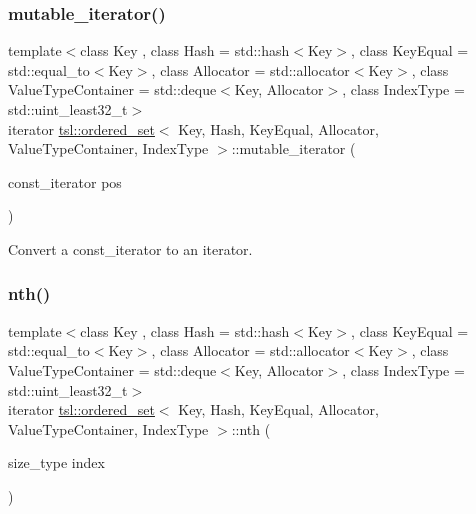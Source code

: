 \subsubsection{\texorpdfstring{mutable\_iterator()}{mutable\_iterator()}}
{\footnotesize\ttfamily template$<$class Key , class Hash  = std\+::hash$<$\+Key$>$, class Key\+Equal  = std\+::equal\+\_\+to$<$\+Key$>$, class Allocator  = std\+::allocator$<$\+Key$>$, class Value\+Type\+Container  = std\+::deque$<$\+Key, Allocator$>$, class Index\+Type  = std\+::uint\+\_\+least32\+\_\+t$>$ \\
iterator \mbox{\hyperlink{classtsl_1_1ordered__set}{tsl\+::ordered\+\_\+set}}$<$ Key, Hash, Key\+Equal, Allocator, Value\+Type\+Container, Index\+Type $>$\+::mutable\+\_\+iterator (\begin{DoxyParamCaption}\item[{const\+\_\+iterator}]{pos }\end{DoxyParamCaption})\hspace{0.3cm}{\ttfamily [inline]}}

Convert a const\+\_\+iterator to an iterator. \mbox{\label{classtsl_1_1ordered__set_adc4c67f752a07ced3348b0bc9a5afa3a}} 
\subsubsection{\texorpdfstring{nth()}{nth()}\hspace{0.1cm}{\footnotesize\ttfamily [1/2]}}
{\footnotesize\ttfamily template$<$class Key , class Hash  = std\+::hash$<$\+Key$>$, class Key\+Equal  = std\+::equal\+\_\+to$<$\+Key$>$, class Allocator  = std\+::allocator$<$\+Key$>$, class Value\+Type\+Container  = std\+::deque$<$\+Key, Allocator$>$, class Index\+Type  = std\+::uint\+\_\+least32\+\_\+t$>$ \\
iterator \mbox{\hyperlink{classtsl_1_1ordered__set}{tsl\+::ordered\+\_\+set}}$<$ Key, Hash, Key\+Equal, Allocator, Value\+Type\+Container, Index\+Type $>$\+::nth (\begin{DoxyParamCaption}\item[{size\+\_\+type}]{index }\end{DoxyParamCaption})\hspace{0.3cm}{\ttfamily [inline]}}

